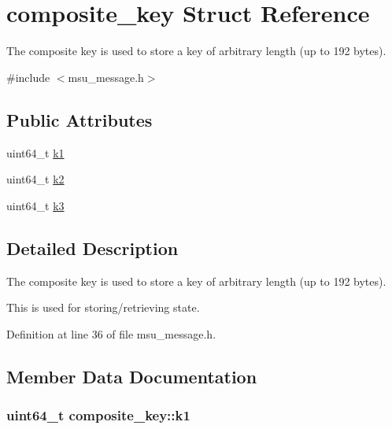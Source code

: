 \hypertarget{structcomposite__key}{\section{composite\-\_\-key Struct Reference}
\label{structcomposite__key}
}


The composite key is used to store a key of arbitrary length (up to 192 bytes).  




{\ttfamily \#include $<$msu\-\_\-message.\-h$>$}

\subsection*{Public Attributes}
\begin{DoxyCompactItemize}
\item 
uint64\-\_\-t \hyperlink{structcomposite__key_a6ec9a3517aa9f50dd7683adcd12c67e1}{k1}
\item 
uint64\-\_\-t \hyperlink{structcomposite__key_acc0a164822bca688f71dfa2d2ef2f536}{k2}
\item 
uint64\-\_\-t \hyperlink{structcomposite__key_a6a97650be5bd7102fca8a17b82c88bb5}{k3}
\end{DoxyCompactItemize}


\subsection{Detailed Description}
The composite key is used to store a key of arbitrary length (up to 192 bytes). 

This is used for storing/retrieving state. 

Definition at line 36 of file msu\-\_\-message.\-h.



\subsection{Member Data Documentation}
\hypertarget{structcomposite__key_a6ec9a3517aa9f50dd7683adcd12c67e1}{
\subsubsection[{k1}]{\setlength{\rightskip}{0pt plus 5cm}uint64\-\_\-t composite\-\_\-key\-::k1}}\label{structcomposite__key_a6ec9a3517aa9f50dd7683adcd12c67e1}


